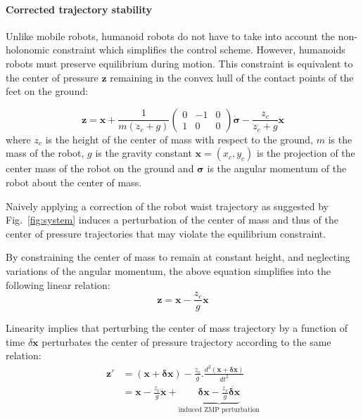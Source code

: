 \paragraph{Corrected trajectory stability}
Unlike mobile robots, humanoid robots do not have to take into account
the non-holonomic constraint which simplifies the control
scheme. However, humanoids robots must preserve equilibrium during
motion. This constraint is equivalent to the center of pressure $\mathbf{z}$
remaining in the convex hull of the contact points of the feet on the ground:


\begin{equation} \label{eq:zmp1}
  \mathbf{z} = \mathbf{x} + \frac{1}{m(\ddot{z}_c + g)}\left(\begin{array}{ccc} 0 &-1 &0\\1 &0 &0\end{array}\right) \mathbf{\dot{\sigma}} - \frac{z_c}{\ddot{z}_c + g} \ddot{\mathbf{x}}
\end{equation}
where $z_c$ is the height of the center of mass with respect to the
ground, $m$ is the mass of the robot, $g$ is the gravity constant
\mbox{$\mathbf{x}=(x_c,y_c)$} is the projection of the center mass of
the robot on the ground and $\mathbf{\sigma}$ is the angular momentum
of the robot about the center of mass.

Naively applying a correction of the robot waist trajectory as
suggested by Fig.~\ref{fig:system} induces a perturbation of the
center of mass and thus of the center of pressure trajectories that
may violate the equilibrium constraint.

By constraining the center of mass to remain at constant height, and neglecting
variations of the angular momentum, the above equation simplifies into the
following linear relation:
\begin{equation} \label{eq:zmp2}
  \mathbf{z} = \mathbf{x}  - \frac{z_c}{g} \ddot{\mathbf{x}}
\end{equation}

Linearity implies that perturbing the center of mass trajectory by a
function of time \mbox{$\delta \mathbf{x}$} perturbates the center of
pressure trajectory according to the same relation:
\begin{equation} \label{eq:zmpperturbation}
\begin{split}
  \mathbf{z'} &= (\mathbf{x} + \mathbf{\delta x}) - \frac{z_c}{g} .
  \frac{d^2 (\mathbf{x} + \mathbf{\delta x})}{d t^2}\\
  &= \mathbf{x} - \frac{z_c}{g} \ddot{\mathbf{x}} +
  \underbrace{\mathbf{\delta x} - \frac{z_c}{g} \ddot{\mathbf{\delta
        x}}}_{\text{induced ZMP perturbation}}
\end{split}
\end{equation}

